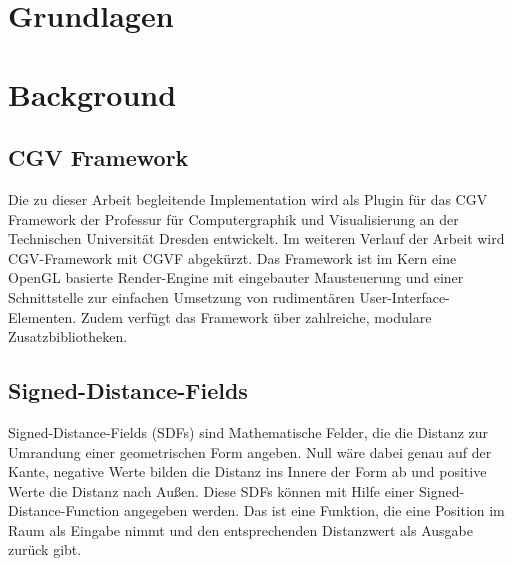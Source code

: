 {\chapter{Grundlagen}}
{\chapter{Background}}
\label{sec:background}

\section{CGV Framework}
Die zu dieser Arbeit begleitende Implementation wird als Plugin für das CGV Framework\cite{cgv2021} der Professur für Computergraphik und Visualisierung an der Technischen Universität Dresden entwickelt.
Im weiteren Verlauf der Arbeit wird CGV-Framework mit CGVF abgekürzt.
Das Framework ist im Kern eine OpenGL basierte Render-Engine mit eingebauter Mausteuerung und einer Schnittstelle zur einfachen Umsetzung von rudimentären User-Interface-Elementen. Zudem verfügt das Framework über zahlreiche, modulare Zusatzbibliotheken.

\section{Signed-Distance-Fields}
Signed-Distance-Fields (SDFs) sind Mathematische Felder, die die Distanz zur Umrandung einer geometrischen Form angeben. Null wäre dabei genau auf der Kante, negative Werte bilden die Distanz ins Innere der Form ab und positive Werte die Distanz nach Außen.
Diese SDFs können mit Hilfe einer Signed-Distance-Function angegeben werden.
Das ist eine Funktion, die eine Position im Raum als Eingabe nimmt und den entsprechenden Distanzwert als Ausgabe zurück gibt.

